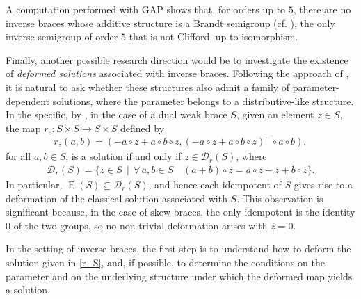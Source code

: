 \documentclass[preprint,1p]{elsarticle}
\theoremstyle{definition}               %
\DeclareMathOperator{\E}{E}
\begin{document}
A computation performed with GAP shows that, for orders up to $5$, there are no inverse braces whose additive structure is a Brandt semigroup (cf. \cite[p. 152]{Ho95}), the only inverse semigroup of order $5$ that is not Clifford, up to isomorphism.



 \medskip 


Finally, another possible research direction would be to investigate the existence of \emph{deformed solutions} associated with inverse braces. Following the approach of \cite{DoRy24, MaRySt25}, it is natural to ask whether these structures also admit a family of parameter-dependent solutions, where the parameter belongs to a distributive-like structure. In the specific, by \cite[Theorem 3.9]{MaRySt25}, in the case of a dual weak brace $S$, given an element $z \in S$, the map $r_{z}:S \times S \to S \times S$ defined by
\begin{align*}
       r_{z}(a,b)=\left(-a\circ z+a\circ b\circ z, \left(-a\circ z+a\circ b\circ z\right)^{-} \circ a \circ b \right),
    \end{align*}
    for all $a, b \in S$, is a solution if and only if $z \in \mathcal{D}_r(S)$, where
\begin{align*}
    \mathcal{D}_r(S)=\{z \in S \, \mid \, \forall \, a,b \in S \quad (a+b) \circ z=a\circ z-z+b \circ z\}.
\end{align*}
In particular, $\E(S) \subseteq \mathcal{D}_r(S)$, and hence each idempotent of $S$ gives rise to a deformation of the classical solution associated with $S$. This observation is significant because, in the case of skew braces, the only idempotent is the identity $0$ of the two groups, so no non-trivial deformation arises with $z=0$.

In the setting of inverse braces, the first step is to understand how to deform the solution given in \eqref{r_S}, and, if possible, to determine the conditions on the parameter and on the underlying structure under which the deformed map yields a solution.





\bigskip



\bigskip
\end{document}
